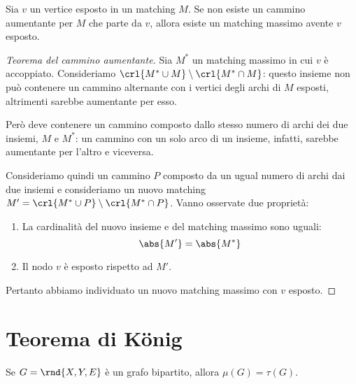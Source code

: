 \documentclass[\main/main.tex]{subfiles}
\begin{document}
\begin{theorem}
	Sia \(v\) un vertice esposto in un matching \(M\). Se non esiste un cammino aumentante per \(M\) che parte da \(v\), allora esiste un matching massimo avente \(v\) esposto.
\end{theorem}

\begin{proof}[Teorema del cammino aumentante]
	Sia \(M^*\) un matching massimo in cui \(v\) è accoppiato. Consideriamo \(\crl{M^*\cup M}\setminus\crl{M^* \cap M}\): questo insieme non può contenere un cammino alternante con i vertici degli archi di \(M\) esposti, altrimenti sarebbe aumentante per esso.

	Però deve contenere un cammino composto dallo stesso numero di archi dei due insiemi, \(M\) e \(M^*\): un cammino con un solo arco di un insieme, infatti, sarebbe aumentante per l'altro e viceversa.

	Consideriamo quindi un cammino \(P\) composto da un ugual numero di archi dai due insiemi e consideriamo un nuovo matching \(M' = \crl{M^*\cup P}\setminus\crl{M^* \cap P}\). Vanno osservate due proprietà:

	\begin{enumerate}
		\item La cardinalità del nuovo insieme e del matching massimo sono uguali:
		      \[
			      \abs{M'} = \abs{M^*}
		      \]
		\item Il nodo \(v\) è esposto rispetto ad \(M'\).
	\end{enumerate}
	Pertanto abbiamo individuato un nuovo matching massimo con \(v\) esposto.
\end{proof}
\clearpage
\section{Teorema di König}

\begin{theorem}
	Se \(G=\rnd{X, Y, E}\) è un grafo bipartito, allora \(\mu(G) = \tau(G)\).
\end{theorem}
\end{document}
